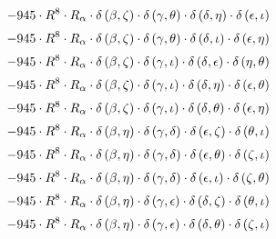 \begin{subequations}
\begin{gather}
 \\[0.2em] \notag 		 - 945 \cdot R^{8} \cdot R_{\alpha{}} \cdot \delta{}\left(\beta{}, \zeta{}\right) \cdot \delta{}\left(\gamma{}, \theta{}\right) \cdot \delta{}\left(\delta{}, \eta{}\right) \cdot \delta{}\left(\epsilon{}, \iota{}\right) 
 \\[0.2em] \notag 		 - 945 \cdot R^{8} \cdot R_{\alpha{}} \cdot \delta{}\left(\beta{}, \zeta{}\right) \cdot \delta{}\left(\gamma{}, \theta{}\right) \cdot \delta{}\left(\delta{}, \iota{}\right) \cdot \delta{}\left(\epsilon{}, \eta{}\right) 
 \\[0.2em] \notag 		 - 945 \cdot R^{8} \cdot R_{\alpha{}} \cdot \delta{}\left(\beta{}, \zeta{}\right) \cdot \delta{}\left(\gamma{}, \iota{}\right) \cdot \delta{}\left(\delta{}, \epsilon{}\right) \cdot \delta{}\left(\eta{}, \theta{}\right) 
 \\[0.2em] \notag 		 - 945 \cdot R^{8} \cdot R_{\alpha{}} \cdot \delta{}\left(\beta{}, \zeta{}\right) \cdot \delta{}\left(\gamma{}, \iota{}\right) \cdot \delta{}\left(\delta{}, \eta{}\right) \cdot \delta{}\left(\epsilon{}, \theta{}\right) 
 \\[0.2em] \notag 		 - 945 \cdot R^{8} \cdot R_{\alpha{}} \cdot \delta{}\left(\beta{}, \zeta{}\right) \cdot \delta{}\left(\gamma{}, \iota{}\right) \cdot \delta{}\left(\delta{}, \theta{}\right) \cdot \delta{}\left(\epsilon{}, \eta{}\right) 
 \\[0.2em] \notag 		 - 945 \cdot R^{8} \cdot R_{\alpha{}} \cdot \delta{}\left(\beta{}, \eta{}\right) \cdot \delta{}\left(\gamma{}, \delta{}\right) \cdot \delta{}\left(\epsilon{}, \zeta{}\right) \cdot \delta{}\left(\theta{}, \iota{}\right) 
 \\[0.2em] \notag 		 - 945 \cdot R^{8} \cdot R_{\alpha{}} \cdot \delta{}\left(\beta{}, \eta{}\right) \cdot \delta{}\left(\gamma{}, \delta{}\right) \cdot \delta{}\left(\epsilon{}, \theta{}\right) \cdot \delta{}\left(\zeta{}, \iota{}\right) 
 \\[0.2em] \notag 		 - 945 \cdot R^{8} \cdot R_{\alpha{}} \cdot \delta{}\left(\beta{}, \eta{}\right) \cdot \delta{}\left(\gamma{}, \delta{}\right) \cdot \delta{}\left(\epsilon{}, \iota{}\right) \cdot \delta{}\left(\zeta{}, \theta{}\right) 
 \\[0.2em] \notag 		 - 945 \cdot R^{8} \cdot R_{\alpha{}} \cdot \delta{}\left(\beta{}, \eta{}\right) \cdot \delta{}\left(\gamma{}, \epsilon{}\right) \cdot \delta{}\left(\delta{}, \zeta{}\right) \cdot \delta{}\left(\theta{}, \iota{}\right) 
 \\[0.2em] \notag 		 - 945 \cdot R^{8} \cdot R_{\alpha{}} \cdot \delta{}\left(\beta{}, \eta{}\right) \cdot \delta{}\left(\gamma{}, \epsilon{}\right) \cdot \delta{}\left(\delta{}, \theta{}\right) \cdot \delta{}\left(\zeta{}, \iota{}\right) 

\end{gather}
\end{subequations}

